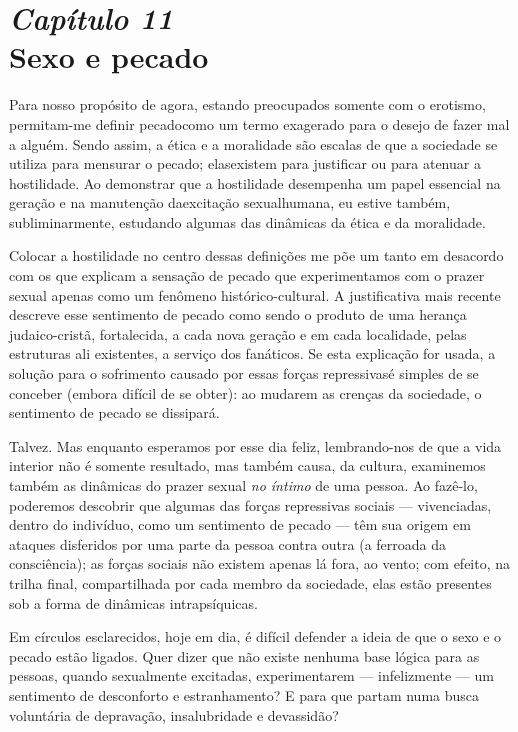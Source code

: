 \chapter[\textbf{11}\quad Sexo e pecado]{{\large\textit{Capítulo 11}}\\ Sexo e pecado}


Para nosso propósito de agora, estando preocupados somente com o
erotismo, permitam-me definir pecado\idxpecad[|(] como um termo exagerado para o
desejo de fazer mal a alguém. Sendo assim, a ética e a\idxpervrespo{} moralidade\idxrespo{} são
escalas de que a sociedade se utiliza para mensurar o pecado; elas\idxsexuehos[|(]
existem para justificar ou para atenuar a hostilidade. Ao demonstrar
que a hostilidade desempenha um papel essencial na geração e na\idxpecaddel{}
manutenção da\idxsexue[|(] excitação sexual\idxhostexci[|(] humana, eu estive também,
subliminarmente, estudando algumas das dinâmicas da ética e da
moralidade.

Colocar a hostilidade no centro dessas definições me põe um tanto em
desacordo com os que explicam a sensação de pecado que experimentamos
com o prazer sexual apenas como um fenômeno histórico-cultural. A
justificativa mais recente descreve esse sentimento de pecado como
sendo o produto de uma herança judaico-cristã, fortalecida, a cada
nova geração e em cada localidade, pelas estruturas ali existentes, a
serviço dos fanáticos. Se esta explicação for usada, a solução para o
sofrimento causado por essas forças repressivas\idxaspecrep[|(] é simples de se
conceber (embora difícil de se obter): ao mudarem as crenças da
sociedade, o sentimento de pecado se dissipará.

Talvez. Mas enquanto esperamos por esse dia feliz, lembrando-nos de
que a vida interior não é somente resultado, mas também causa, da
cultura, examinemos também as dinâmicas\idxsexuedin{} do prazer sexual \textit{no
íntimo} de uma pessoa. Ao fazê-lo, poderemos descobrir que algumas das
forças repressivas sociais --- vivenciadas, dentro do indivíduo, como
um sentimento de pecado --- têm sua origem em ataques disferidos por
uma parte da pessoa contra outra (a ferroada da consciência); as forças
sociais não existem apenas lá fora, ao vento; com efeito, na trilha
final, compartilhada por cada membro da sociedade, elas estão presentes
sob a forma de dinâmicas intrapsíquicas.

Em círculos esclarecidos, hoje em dia, é difícil defender a ideia de
que o sexo e o pecado estão ligados. Quer dizer que não existe nenhuma
base lógica para as pessoas, quando sexualmente excitadas,
experimentarem --- infelizmente --- um sentimento de desconforto e
estranhamento? E para que partam numa busca voluntária de depravação,
insalubridade e devassidão?

